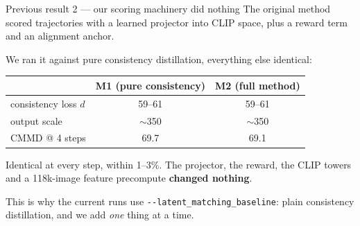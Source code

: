 \documentclass[10pt,aspectratio=169]{beamer}
\begin{document}
\begin{frame}{Previous result 2 --- our scoring machinery did nothing}
  The original method scored trajectories with a learned projector into CLIP space,
  plus a reward term and an alignment anchor.

  \vspace{0.8em}
  We ran it against pure consistency distillation, everything else identical:

  \begin{center}
  \begin{tabular}{lcc}
    \toprule
     & M1 (pure consistency) & M2 (full method) \\
    \midrule
    consistency loss $d$ & 59--61 & 59--61 \\
    output scale         & $\sim$350 & $\sim$350 \\
    CMMD @ 4 steps       & 69.7 & 69.1 \\
    \bottomrule
  \end{tabular}
  \end{center}

  \vspace{0.8em}
  Identical at every step, within 1--3\%. The projector, the reward, the CLIP towers and a
  118k-image feature precompute \textbf{changed nothing}.

  \begin{block}{}
    This is why the current runs use \texttt{-{}-latent\_matching\_baseline}:
    plain consistency distillation, and we add \emph{one} thing at a time.
  \end{block}
\end{frame}
\end{document}
